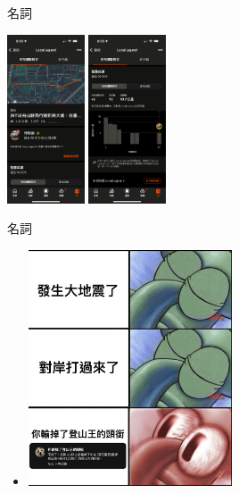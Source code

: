 \begin{frame}{名詞}
\begin{itemize}
\includegraphics[height=5cm]{localLegend.png}
\includegraphics[height=5cm]{localLegend2.png}
\end{itemize}
\end{frame}

\begin{frame}{名詞}
\begin{itemize}
\item \begin{center}\includegraphics[height=7cm]{KOMmeme.jpg}\end{center}
\end{itemize}
\end{frame}

